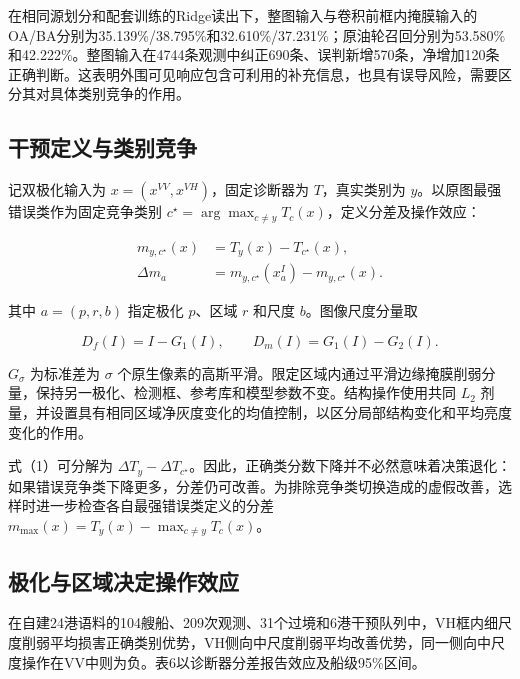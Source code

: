 \documentclass[journal,10pt,a4paper]{IEEEtran}
\begin{document}
在相同源划分和配套训练的Ridge读出下，整图输入与卷积前框内掩膜输入的OA/BA分别为35.139\%/38.795\%和32.610\%/37.231\%；原油轮召回分别为53.580\%和42.222\%。整图输入在4744条观测中纠正690条、误判新增570条，净增加120条正确判断。这表明外围可见响应包含可利用的补充信息，也具有误导风险，需要区分其对具体类别竞争的作用。

\subsection{干预定义与类别竞争}\label{ux5e72ux9884ux5b9aux4e49ux4e0eux7c7bux522bux7adeux4e89}

记双极化输入为 \(x=(x^{VV},x^{VH})\)，固定诊断器为 \(T\)，真实类别为 \(y\)。以原图最强错误类作为固定竞争类别 \(c^\star=\arg\max_{c\ne y}T_c(x)\)，定义分差及操作效应：

\[\begin{aligned}
m_{y,c^\star}(x)&=T_y(x)-T_{c^\star}(x),\\
\Delta m_a&=m_{y,c^\star}(x_a^I)-m_{y,c^\star}(x).
\end{aligned}\tag{1}\]

其中 \(a=(p,r,b)\) 指定极化 \(p\)、区域 \(r\) 和尺度 \(b\)。图像尺度分量取

\[D_f(I)=I-G_1(I),\qquad D_m(I)=G_1(I)-G_2(I).\tag{2}\]

\(G_\sigma\) 为标准差为 \(\sigma\) 个原生像素的高斯平滑。限定区域内通过平滑边缘掩膜削弱分量，保持另一极化、检测框、参考库和模型参数不变。结构操作使用共同 \(L_2\) 剂量，并设置具有相同区域净灰度变化的均值控制，以区分局部结构变化和平均亮度变化的作用。

式（1）可分解为 \(\Delta T_y-\Delta T_{c^\star}\)。因此，正确类分数下降并不必然意味着决策退化：如果错误竞争类下降更多，分差仍可改善。为排除竞争类切换造成的虚假改善，选样时进一步检查各自最强错误类定义的分差 \(m_{\max}(x)=T_y(x)-\max_{c\ne y}T_c(x)\)。

\subsection{极化与区域决定操作效应}\label{ux6781ux5316ux4e0eux533aux57dfux51b3ux5b9aux64cdux4f5cux6548ux5e94}

在自建24港语料的104艘船、209次观测、31个过境和6港干预队列中，VH框内细尺度削弱平均损害正确类别优势，VH侧向中尺度削弱平均改善优势，同一侧向中尺度操作在VV中则为负。表6以诊断器分差报告效应及船级95\%区间。
\end{document}
